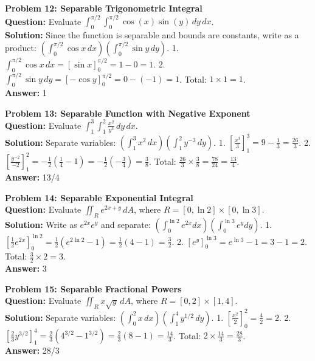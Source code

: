 \documentclass[11pt]{article}
\begin{document}
\vspace{0.5cm}
\noindent\textbf{Problem 12: Separable Trigonometric Integral} \\
\textbf{Question:} Evaluate $\int_0^{\pi/2} \int_0^{\pi/2} \cos(x)\sin(y) \, dy \, dx$. \\
\textbf{Solution:} Since the function is separable and bounds are constants, write as a product:
$\left(\int_0^{\pi/2} \cos x \, dx\right) \left(\int_0^{\pi/2} \sin y \, dy\right)$.
1. $\int_0^{\pi/2} \cos x \, dx = [\sin x]_0^{\pi/2} = 1 - 0 = 1$.
2. $\int_0^{\pi/2} \sin y \, dy = [-\cos y]_0^{\pi/2} = 0 - (-1) = 1$.
Total: $1 \times 1 = 1$. \\
\textbf{Answer:} 1

\vspace{0.5cm}
\noindent\textbf{Problem 13: Separable Function with Negative Exponent} \\
\textbf{Question:} Evaluate $\int_1^3 \int_1^2 \frac{x^2}{y^3} \, dy \, dx$. \\
\textbf{Solution:} Separate variables: $\left(\int_1^3 x^2 \, dx\right) \left(\int_1^2 y^{-3} \, dy\right)$.
1. $\left[\frac{x^3}{3}\right]_1^3 = 9 - \frac{1}{3} = \frac{26}{3}$.
2. $\left[\frac{y^{-2}}{-2}\right]_1^2 = -\frac{1}{2}(\frac{1}{4} - 1) = -\frac{1}{2}(-\frac{3}{4}) = \frac{3}{8}$.
Total: $\frac{26}{3} \times \frac{3}{8} = \frac{78}{24} = \frac{13}{4}$. \\
\textbf{Answer:} 13/4

\vspace{0.5cm}
\noindent\textbf{Problem 14: Separable Exponential Integral} \\
\textbf{Question:} Evaluate $\iint_R e^{2x+y} \, dA$, where $R = [0,\ln 2] \times [0,\ln 3]$. \\
\textbf{Solution:} Write as $e^{2x}e^y$ and separate:
$\left(\int_0^{\ln 2} e^{2x} dx\right)\left(\int_0^{\ln 3} e^y dy\right)$.
1. $\left[\frac{1}{2}e^{2x}\right]_0^{\ln 2} = \frac{1}{2}(e^{2\ln 2} - 1) = \frac{1}{2}(4 - 1) = \frac{3}{2}$.
2. $\left[e^y\right]_0^{\ln 3} = e^{\ln 3} - 1 = 3 - 1 = 2$.
Total: $\frac{3}{2} \times 2 = 3$. \\
\textbf{Answer:} 3

\vspace{0.5cm}
\noindent\textbf{Problem 15: Separable Fractional Powers} \\
\textbf{Question:} Evaluate $\iint_R x \sqrt{y} \, dA$, where $R = [0,2] \times [1,4]$. \\
\textbf{Solution:} Separate variables: $\left(\int_0^2 x \, dx\right)\left(\int_1^4 y^{1/2} \, dy\right)$.
1. $\left[\frac{x^2}{2}\right]_0^2 = \frac{4}{2} = 2$.
2. $\left[\frac{2}{3}y^{3/2}\right]_1^4 = \frac{2}{3}(4^{3/2} - 1^{3/2}) = \frac{2}{3}(8 - 1) = \frac{14}{3}$.
Total: $2 \times \frac{14}{3} = \frac{28}{3}$. \\
\textbf{Answer:} 28/3
\end{document}
